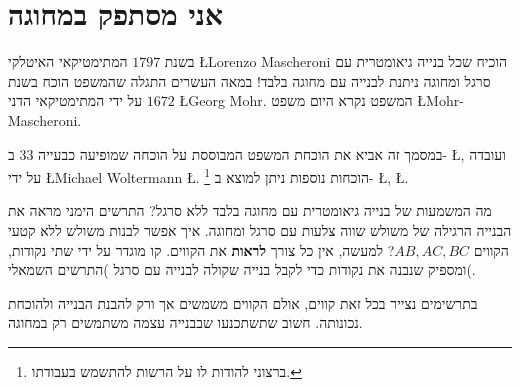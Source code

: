 



\chapter{אני מסתפק במחוגה}\label{c.compass-only}


בשנת
$1797$
המתימטיקאי האיטלקי
\L{Lorenzo Mascheroni}
הוכיח שכל בנייה גיאומטרית עם סרגל ומחוגה ניתנת לבנייה עם מחוגה בלבד! במאה העשרים התגלה שהמשפט הוכח בשנת
$1672$
על ידי המתימטיקאי הדני
\L{Georg Mohr}.
המשפט נקרא היום משפט
\L{Mohr-Mascheroni}.

במסמך זה אביא את הוכחת המשפט המבוססת על הוכחה שמופיעה כבעייה
$33$
ב-%
\L{\cite{dorrie1}},
ועובדה על ידי
\L{Michael Woltermann} \L{\cite{dorrie2}}.%
\footnote{%
ברצוני להודות לו על הרשות להתשמש בעבודתו.
}
הוכחות נוספות ניתן למוצא ב-%
\L{\cite{mm}}, \L{\cite{stopel}}.

מה המשמעות של בנייה גיאומטרית עם מחוגה בלבד ללא סרגל? התרשים הימני מראה את הבנייה הרגילה של משולש שווה צלעות עם סרגל ומחוגה. איך אפשר לבנות משולש ללא קטעי הקווים
$AB,AC,BC$?
למעשה, אין כל צורך
\textbf{לראות}
את הקווים. קו מוגדר על ידי שתי נקודות, ומספיק שנבנה את נקודות כדי לקבל בנייה שקולה לבנייה עם סרגל )התרשים השמאלי(.

\begin{center}
\end{center}
בתרשימים נצייר בכל זאת קווים, אולם הקווים משמשים אך ורק להבנת הבנייה ולהוכחת נכונותה. חשוב שתשתכנעו שבבנייה עצמה משתמשים רק במחוגה.



